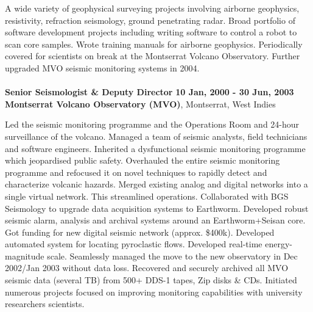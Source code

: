\documentclass[margin,line]{res}
\begin{document}
\begin{resume}
A wide variety of geophysical surveying projects involving airborne geophysics, resistivity,
refraction seismology, ground penetrating radar. Broad portfolio of software development
projects including writing software to control a robot to scan core samples.
Wrote training manuals for airborne geophysics. Periodically covered for scientists on break
at the Montserrat Volcano Observatory. Further upgraded MVO seismic monitoring systems in 2004.
\\
\hdashline
\\
%
{\bf Senior Seismologist \& Deputy Director} \hfill {\bf 10 Jan, 2000 - 30 Jun, 2003} \\
{\bf Montserrat Volcano Observatory (MVO)}, Montserrat, West Indies %
\\
\begin{comment}
Built a robust seismic monitoring programme, tailored to detecting, locating and characterizing
rockfalls and pyroclastic flows in near-real-time. Merged existing analog and digital networks 
into a single virtual network. DInitiated research projects aimed at delivering
a better understanding of volcano-seismicity, and better seismic monitoring tools. 
Real-time, round-the-clock monitoring of the Soufriere Hills Volcano eruption which recommenced in November 1999 and continued until July 2003. . 
\end{comment}
Led the seismic monitoring programme and the Operations Room and 24-hour surveillance of the volcano. Managed a team of seismic analysts, field technicians and software engineers. Inherited a dysfunctional seismic monitoring programme which jeopardised public safety. Overhauled the entire seismic monitoring programme and refocused it on novel techniques to rapidly detect and characterize volcanic hazards. 
Merged existing analog and digital networks into a single virtual network. This streamlined operations.
Collaborated with BGS Seismology to upgrade data acquisition systems to Earthworm.
Developed robust seismic alarm, analysis and archival systems around an Earthworm+Seisan core.
Got funding for new digital seismic network (approx. {\$}400k).
Developed automated system for locating pyroclastic flows.
Developed real-time energy-magnitude scale.
Seamlessly managed the move to the new observatory in Dec 2002/Jan 2003 without data loss.
Recovered and securely archived all MVO seismic data (several TB) from 500+ DDS-1 tapes, Zip disks \& CDs.
Initiated numerous projects focused on improving monitoring capabilities with university researchers scientists.

\end{resume}
\end{document}
